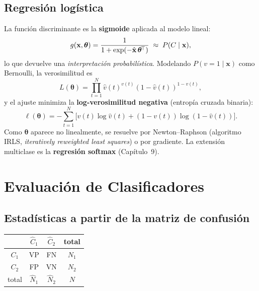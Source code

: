 \subsection{Regresión logística}

La función discriminante es la \textbf{sigmoide} aplicada al modelo
lineal:
\[
g(\mathbf{x},\boldsymbol\theta)=
\frac{1}{1+\exp(-\hat{\mathbf{x}}\,\boldsymbol\theta^{\!\top})}\;\approx\; P(C\mid\mathbf{x}),
\]
lo que devuelve una \emph{interpretación probabilística}. Modelando
$P(v=1\mid\mathbf{x})$ como Bernoulli, la verosimilitud es
\[
L(\boldsymbol\theta)=\prod_{t=1}^{N}\hat v(t)^{v(t)}(1-\hat v(t))^{1-v(t)},
\]
y el ajuste minimiza la \textbf{log-verosimilitud negativa} (entropía
cruzada binaria):
\[
\ell(\boldsymbol\theta)=-\sum_{t=1}^{N}\bigl[v(t)\log\hat v(t)+(1-v(t))\log(1-\hat v(t))\bigr].
\]
Como $\boldsymbol\theta$ aparece no linealmente, se resuelve por
Newton--Raphson (algoritmo IRLS, \emph{iteratively reweighted least
squares}) o por gradiente. La extensión multiclase es la
\textbf{regresión softmax} (Capítulo~9).

\section{Evaluación de Clasificadores}

\subsection{Estadísticas a partir de la matriz de confusión}

\begin{center}
\begin{tabular}{c|cc|c}
\toprule
 & $\hat C_1$ & $\hat C_2$ & total \\
\midrule
$C_1$ & VP & FN & $N_1$ \\
$C_2$ & FP & VN & $N_2$ \\
\midrule
total & $\hat N_1$ & $\hat N_2$ & $N$ \\
\bottomrule
\end{tabular}
\end{center}

